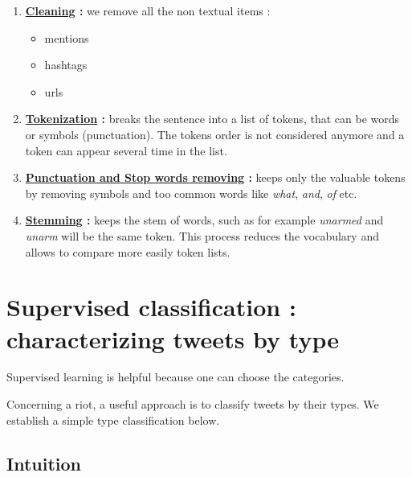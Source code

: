 \documentclass[a4paper,12pt]{report}
\begin{document}
\begin{enumerate}
\item \textbf{\underline{Cleaning} :} we remove all the non textual items : 
  \begin{itemize}
    \item mentions
    \item hashtags
    \item urls
  \end{itemize}
\item \textbf{\underline{Tokenization} :} breaks the sentence into a list of tokens, that can be words or symbols (punctuation). The tokens order is not considered anymore and a token can appear several time in the list.  \\[10pt]
\item \textbf{\underline{Punctuation and Stop words removing} :}  keeps only the valuable tokens by removing symbols and too common words like \emph{what}, \emph{and}, \emph{of} etc.\\[10pt]
\item \textbf{\underline{Stemming} :} keeps the stem of words, such as for example \emph{unarmed} and \emph{unarm} will be the same token. This process reduces the vocabulary and allows to compare more easily token lists.\\[10pt]

\end{enumerate}

\section{Supervised classification : characterizing tweets by type}
Supervised learning is helpful because one can choose the categories. 

Concerning a riot, a useful approach is to classify tweets by their types. We establish a simple type classification below.

\subsection{Intuition}
\end{document}
